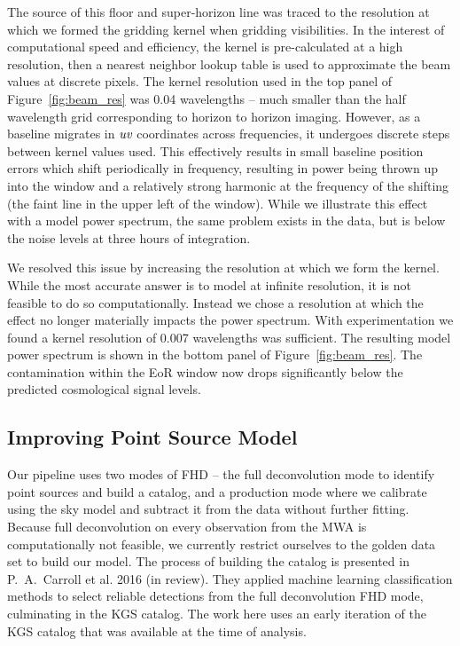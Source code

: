 \documentclass[iop]{emulateapj}
\begin{document}
The source of this floor and super-horizon line was traced to the resolution at which we 
formed the gridding kernel when gridding visibilities. In the interest of computational speed 
and efficiency, the kernel is pre-calculated at a high resolution, then a nearest neighbor 
lookup table is used to approximate the beam values at discrete pixels. The kernel 
resolution used in the top panel of Figure~\ref{fig:beam_res} was 0.04 wavelengths -- much 
smaller than the half wavelength grid corresponding to horizon to horizon imaging. 
However, as a baseline migrates in $\emph{uv}$ coordinates across frequencies, it 
undergoes discrete steps between kernel values used. This effectively results in small 
baseline position errors which shift periodically in frequency, resulting in power being thrown 
up into the window and a relatively strong harmonic at the frequency of the shifting (the faint 
line in the upper left of the window). While we illustrate this effect with a model power 
spectrum, the same problem exists in the data, but is below the noise levels at three hours 
of integration.

We resolved this issue by increasing the resolution at which we form the kernel. While the 
most accurate answer is to model at infinite resolution, it is not feasible to do so 
computationally. Instead we chose a resolution at which the effect no longer materially 
impacts the power spectrum. With experimentation we found a kernel resolution of 0.007 
wavelengths was sufficient. The resulting model power spectrum is shown in the bottom 
panel of Figure~\ref{fig:beam_res}. The contamination within the EoR window now drops 
significantly below the predicted cosmological signal levels.

\subsection{Improving Point Source Model}

Our pipeline uses two modes of FHD -- the full deconvolution mode to identify point sources 
and build a catalog, and a production mode where we calibrate using the sky model and 
subtract it from the data without further fitting. Because full deconvolution on every 
observation from the MWA is computationally not feasible, we currently restrict ourselves to 
the golden data set to build our model. The process of building the catalog is presented in 
P.~A.~Carroll et al. 2016 (in review). They applied machine learning classification methods 
to select reliable detections from the full deconvolution FHD mode, culminating in the KGS 
catalog. The work here uses an early iteration of the KGS catalog that was available at the 
time of analysis.
\end{document}
